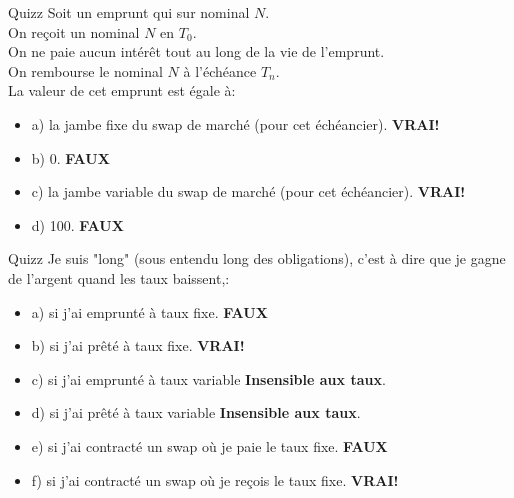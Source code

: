 \documentclass{beamer}
\begin{document}
\begin{frame}{Quizz}
Soit un emprunt qui sur nominal $N$.\\ 
On reçoit un nominal $N$ en $T_0$.\\
On ne paie aucun intérêt tout au long de la vie de l'emprunt.\\
On rembourse le nominal $N$ à l'échéance $T_n$.\\
\vspace{0.5cm}
La valeur de cet emprunt est égale à:
\begin{itemize}
\item a) la jambe fixe du swap de marché (pour cet échéancier). \textbf{\color{green}VRAI!}
\item b) 0. \textbf{\color{red}FAUX}
\item c) la jambe variable du swap de marché (pour cet échéancier). \textbf{\color{green}VRAI!}
\item d) 100. \textbf{\color{red}FAUX}
\end{itemize}
\end{frame}

\begin{frame}{Quizz}
Je suis "long" (sous entendu long des obligations), c'est à dire que je gagne de l'argent quand les taux baissent,:
\begin{itemize}
\item a) si j'ai emprunté à taux fixe. \textbf{\color{red}FAUX}
\item b) si j'ai prêté à taux fixe. \textbf{\color{green}VRAI!}
\item c) si j'ai emprunté à taux variable \textbf{Insensible aux taux}. 
\item d) si j'ai prêté à taux variable \textbf{Insensible aux taux}.
\item e) si j'ai contracté un swap où je paie le taux fixe. \textbf{\color{red}FAUX}
\item f) si j'ai contracté un swap où je reçois le taux fixe. \textbf{\color{green}VRAI!}
\end{itemize}
\end{frame}
\end{document}
